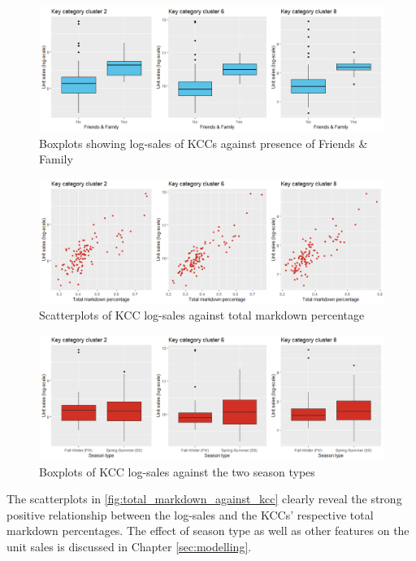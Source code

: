 \begin{figure}[H]
\centering
  \includegraphics[width=0.95\linewidth]{figures/ff_kcc_boxplot.png}
  \caption{Boxplots showing log-sales of KCCs against presence of Friends \& Family}
  \label{fig:ff_kcc_boxplot}
\end{figure}



\begin{figure}[H]
\centering
  \includegraphics[width=0.95\linewidth]{figures/total_markdown_against_kcc.png}
  \caption{Scatterplots of \ac{KCC} log-sales against total markdown percentage}
  \label{fig:total_markdown_against_kcc}
\end{figure}




\begin{figure}[H]
\centering
  \includegraphics[width=0.95\linewidth]{figures/season_type_against_kcc.png}
  \caption{Boxplots of \ac{KCC} log-sales against the two season types}
  \label{fig:season_type_against_kcc}
\end{figure}


The scatterplots in \autoref{fig:total_markdown_against_kcc} clearly reveal the strong positive relationship between the log-sales and the \ac{KCC}s' respective total markdown percentages. The effect of season type as well as other features on the unit sales is discussed in Chapter \ref{sec:modelling}.




